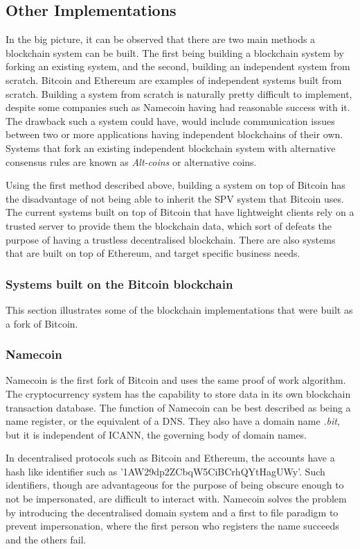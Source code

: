 \documentclass[english]{tktltiki}
\begin{document}
\subsection{Other Implementations}

In the big picture, it can be observed that there are two main methods a blockchain system can be built. The first being building a blockchain system by forking an existing system, and the second, building an independent system from scratch. Bitcoin and Ethereum are examples of independent systems built from scratch. Building a system from scratch is naturally pretty difficult to implement, despite some companies such as Namecoin having had reasonable success with it. The drawback such a system could have, would include communication issues between two or more applications having independent blockchains of their own. Systems that fork an existing independent blockchain system with alternative consensus rules are known as \textit{Alt-coins} or alternative coins. 

Using the first method described above, building a system on top of Bitcoin has the disadvantage of not being able to inherit the SPV system that Bitcoin uses. The current systems built on top of Bitcoin that have lightweight clients rely on a trusted server to provide them the blockchain data, which sort of defeats the purpose of having a trustless decentralised blockchain. There are also systems that are built on top of Ethereum, and target specific business needs.


\subsubsection{Systems built on the Bitcoin blockchain}
This section illustrates some of the blockchain implementations that were built as a fork of Bitcoin. 

\subsubsection*{Namecoin}
Namecoin \cite{namecoin} is the first fork of Bitcoin and uses the same proof of work algorithm. The cryptocurrency system has the capability to store data in its own blockchain transaction database. The function of Namecoin can be best described as being a name register, or the equivalent of a DNS. They also have a domain name \textit{.bit}, but it is independent of ICANN, the governing body of domain names. 

In decentralised protocols such as Bitcoin and Ethereum, the accounts have a hash like identifier such as '1AW29dp2ZCbqW5CiBCrhQYtHagUWy'. Such identifiers, though are advantageous for the purpose of being obscure enough to not be impersonated, are difficult to interact with. Namecoin solves the problem by introducing the decentralised domain system and a first to file paradigm to prevent impersonation, where the first person who registers the name succeeds and the others fail.
\end{document}
